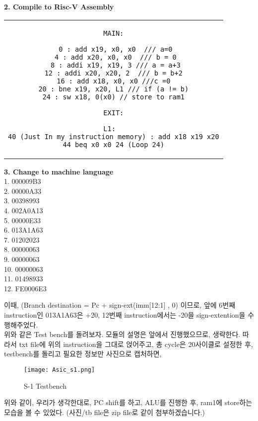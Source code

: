 \documentclass[oneside]{article}
\begin{document}
\begin{center}

\end{center}

\begin{center}
\textbf{2. Compile to Risc-V Assembly }
\end{center}

\begin{center}
\begin{tabular}{c}
\begin{lstlisting}[language={[RISC-V]Assembler}]
MAIN:

 0 : add x19, x0, x0  /// a=0
 4 : add x20, x0, x0  /// b = 0
 8 : addi x19, x19, 3 /// a = a+3
12 : addi x20, x20, 2  /// b = b+2
16 : add x18, x0, x0 ///c =0
20 : bne x19, x20, L1 /// if (a != b)
24 : sw x18, 0(x0) // store to ram1

EXIT:

L1:  
40 (Just In my instruction memory) : add x18 x19 x20
44 beq x0 x0 24 (Loop 24)

\end{lstlisting}
\end{tabular}
\end{center}

\begin{center}

\end{center}
\newpage

\begin{center}
\textbf{3. Change to machine language }\\
 1.  000009B3\\
 2.  00000A33\\
 3.  00398993\\
 4.  002A0A13\\
 5.  00000E33\\
 6.  013A1A63\\
 7.  01202023\\
 8.  00000063\\
 9.  00000063\\
10.	00000063\\
11.	01498933\\
12.	FE0006E3\\
\end{center}

이때, (Branch destination = Pc + sign-ext(imm[12:1] , 0) 이므로, 앞에 6번째 instruction인 013A1A63은 +20, 12번째 instruction에서는 -20을 sign-extention을 수행해주었다.\\
위와 같은 Test bench를 돌려보자. 모듈의 설명은 앞에서 진행했으므로, 생략한다. 따라서 txt file에 위의 instruction을 그대로 얹어주고, 총 cycle은 20사이클로 설정한 후, testbench를 돌리고 필요한 정보만 사진으로 캡처하면, 
\begin{figure}[h]
    \texttt{[image: Asic\_s1.png]}
    \centering
    \caption{S-1 Testbench}
\end{figure}
위와 같이, 우리가 생각한대로, PC shift를 하고, ALU를 진행한 후, ram1에 store하는 모습을 볼 수 있었다. (사진/tb file은 zip file로 같이 첨부하겠습니다.)
\end{document}

